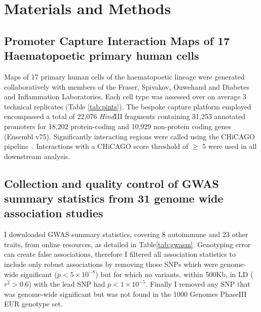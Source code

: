 \documentclass[a4paper,11pt]{report}
\begin{document}

\chapter{Materials and Methods}

\section{Promoter Capture Interaction Maps of 17 Haematopoetic primary human cells}
Maps of 17 primary human cells of the haematopoetic lineage were generated collaboratively with members of the Fraser, Spivakov, Ouwehand and Diabetes and Inflammation Laboratories. Each cell type was assessed over on average 3 technical replicates (Table \ref{tab:pints}). The bespoke capture platform employed encompassed a total of 22,076 \textit{Hind}III fragments containing 31,253 annotated promoters for 18,202 protein-coding and 10,929 non-protein coding genes (Ensembl v75). Significantly interacting regions were called using the CHiCAGO pipeline~\citep{CairnsFreire-PritchettWingettEtAl2016}. Interactions with a CHiCAGO score threshold of $\geqslant$ 5 were used in all downstream analysis.

\section{Collection and quality control of GWAS summary statistics from 31 genome wide association studies}
I downloaded GWAS summary statistics, covering 8 autoimmune and 23 other traits, from online resources, as detailed in Table\ref{tab:gwasm}. Genotyping error can create false associations,  therefore I filtered all association statistics to include only robust associations by removing those SNPs which were genome-wide significant ($p < 5 \times 10^{-8}$) but for which no variants, within 500Kb, in LD ($r^{2} > 0.6$) with the lead SNP had $p < 1 \times 10^{-5}$. Finally I removed any SNP that was genome-wide significant but was not found in the 1000 Genomes PhaseIII EUR genotype set. 
\end{document}

